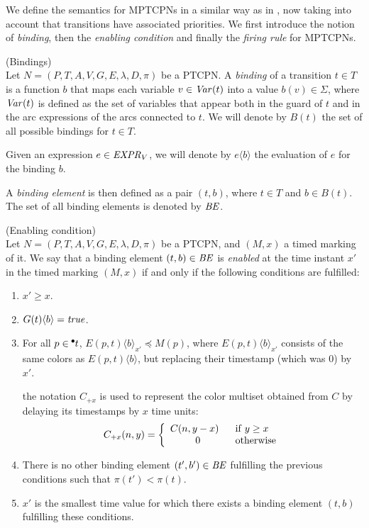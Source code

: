 We define the semantics for MPTCPNs in a similar way as in \cite{CPN09}, 
now taking into account that transitions have associated priorities.
We first introduce the notion of {\em binding}, then
the {\em enabling condition} and finally the {\em firing rule}
for MPTCPNs.

\begin{definition} (Bindings)\\
Let $N=(P,T,A,V,G,E,\lambda,D,\pi)$ be a PTCPN.
A {\em binding} of a transition $t \in T$ is a function
$b$ that maps each variable $v \in {\it Var}(t)$
into a value $b(v) \in \Sigma$, where ${\it Var}(t)$
is defined as the set of variables that appear both
in the guard of $t$ and
in the arc expressions of the arcs connected to $t$.
We will denote by $B(t)$ the set of all possible bindings
for $t \in T$. 

Given an expression $e \in {\it EXPR}_V$, we will denote 
by $e\langle b \rangle$ the evaluation of $e$ for the
binding $b$.

A {\em binding element} is then defined as a pair
$(t,b)$, where $t \in T$ and $b \in B(t)$.
The set of all binding elements is denoted by ${\it BE}$.
\end{definition}

\begin{definition}\label{permitidas} (Enabling condition)\\
Let $N=(P,T,A,V,G,E,\lambda,D,\pi)$ be a PTCPN,
and $(M,x)$ a timed marking of it.
We say that a 
binding element $(t,b) \in {\it BE}$
is {\em enabled} at the time instant $x'$ in the timed marking
$(M,x)$ if and
only if the following conditions are fulfilled:

\begin{enumerate}
\item $x' \geq x$.
%
\item $G(t)\langle b \rangle = {\it true}$.
%
\item For all $p \in \hspace*{-0.4em}~^{\bullet} \hspace*{-0.05em}t$,
$E(p,t)\langle b\rangle_{x'} \preceq M(p)$, 
where 
%
$E(p,t)\langle b \rangle_{x'}$ consists of the same
colors as $E(p,t)\langle b \rangle$, but 
replacing their timestamp (which was $0$) by $x'$.
%

the notation $C_{+x}$ is used to represent the
color multiset obtained from $C$ by delaying its timestamps
by $x$ time units:
%
\[
C_{+x}(n,y) = \left\{
\begin{array}{cl}
C(n,y-x)~~ & {\rm if}\;y \geq  x\\
0        & {\rm otherwise}
\end{array}
\right.
\]
%
\item There is no other binding element $(t',b') \in {\it BE}$
fulfilling the previous conditions  such that $\pi(t') < \pi(t)$.
%
%
\item $x'$ is the smallest time value for which there exists
a binding element $(t,b)$ fulfilling these conditions.
%
\end{enumerate}
%
\end{definition}

